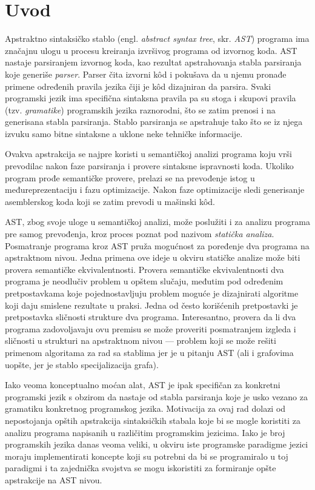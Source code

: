\chapter{Uvod}
\label{chp:Intro}

Apstraktno sintaksičko stablo (engl. \emph{abstract syntax tree}, skr. \emph{AST}) programa ima značajnu ulogu u procesu kreiranja izvršivog programa od izvornog koda. AST nastaje parsiranjem izvornog koda, kao rezultat apstrahovanja stabla parsiranja koje generiše \emph{parser}. Parser čita izvorni k\^od i pokušava da u njemu pronađe primene određenih pravila jezika čiji je k\^od dizajniran da parsira. Svaki programski jezik ima specifična sintaksna pravila pa su stoga i skupovi pravila (tzv. \emph{gramatike}) programskih jezika raznorodni, što se zatim prenosi i na generisana stabla parsiranja. Stablo parsiranja se apstrahuje tako što se iz njega izvuku samo bitne sintaksne a uklone neke tehničke informacije.

Ovakva apstrakcija se najpre koristi u semantičkoj analizi programa koju vrši prevodilac nakon faze parsiranja i provere sintaksne ispravnosti koda. Ukoliko program prođe semantičke provere, prelazi se na prevođenje istog u međureprezentaciju i fazu optimizacije. Nakon faze optimizacije sledi generisanje asemblerskog koda koji se zatim prevodi u mašinski k\^od.

AST, zbog svoje uloge u semantičkoj analizi, može poslužiti i za analizu programa pre samog prevođenja, kroz proces poznat pod nazivom \emph{statička analiza}. Posmatranje programa kroz AST pruža mogućnost za poređenje dva programa na apstraktnom nivou. Jedna primena ove ideje u okviru statičke analize može biti provera semantičke ekvivalentnosti. Provera semantičke ekvivalentnosti dva programa je neodlučiv problem u opštem slučaju, međutim pod određenim pretpostavkama koje pojednostavljuju problem moguće je dizajnirati algoritme koji daju smislene rezultate u praksi. Jedna od često korišćenih pretpostavki je pretpostavka sličnosti strukture dva programa. Interesantno, provera da li dva programa zadovoljavaju ovu premisu se može proveriti posmatranjem izgleda i sličnosti u strukturi na apstraktnom nivou --- problem koji se može rešiti primenom algoritama za rad sa stablima jer je u pitanju AST (ali i grafovima uopšte, jer je stablo specijalizacija grafa).

Iako veoma konceptualno moćan alat, AST je ipak specifičan za konkretni programski jezik s obzirom da nastaje od stabla parsiranja koje je usko vezano za gramatiku konkretnog programskog jezika. Motivacija za ovaj rad dolazi od nepostojanja opštih apstrakcija sintaksičkih stabala koje bi se mogle koristiti za analizu programa napisanih u različitim programskim jezicima. Iako je broj programskih jezika danas veoma veliki, u okviru iste programske paradigme jezici moraju implementirati koncepte koji su potrebni da bi se programiralo u toj paradigmi i ta zajednička svojstva se mogu iskoristiti za formiranje opšte apstrakcije na AST nivou. 


